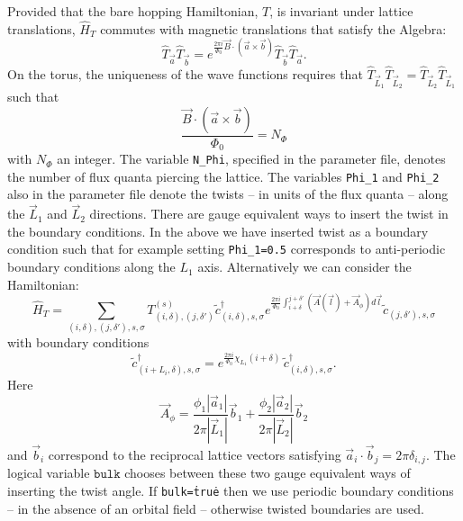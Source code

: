 Provided that the bare hopping Hamiltonian, $T$,  is invariant under lattice translations, $\hat{H}_T$ commutes with magnetic translations  that satisfy the  Algebra: 
\begin{equation}
\hat{T}_{\vec{a}} \hat{T}_{\vec{b}} =  e^{ \frac{2 \pi i}{\Phi_0}   \vec{B} \cdot \left( \vec{a} \times \vec{b} \right) }  \hat{T}_{\vec{b}} \hat{T}_{\vec{a}}. 
\end{equation}
On the  torus, the uniqueness of the wave functions requires that  $\hat{T}_{\vec{L}_1} \hat{T}_{\vec{L}_2}  =   \hat{T}_{\vec{L}_2} \hat{T}_{\vec{L}_1} $ such
that
\begin{equation}
\frac{\vec{B} \cdot \left( \vec{a} \times \vec{b}  \right) }{\Phi_0 } = N_{\Phi}   
\end{equation}
with  $N_\Phi $ an integer.  The variable \texttt{N\_Phi},   specified in the parameter file,   denotes the number of flux quanta piercing the lattice.    The variables \texttt{Phi\_1}  and   \texttt{Phi\_2} also   in the parameter file denote  the twists  -- in units of the flux quanta  --  along the $\vec{L}_1$ and  $\vec{L}_2$ directions.     There are gauge  equivalent ways to insert the  twist in the boundary conditions. In the above we  have inserted   twist as a boundary condition such  that for example setting  \texttt{Phi\_1=0.5}  corresponds to anti-periodic boundary conditions along the $L_1$  axis.   Alternatively we  can  consider the 
Hamiltonian:
\begin{equation}
\hat{H}_T = \sum_{(i,\delta), (j,\delta'), s, \sigma}    T_{(i,\delta), (j,\delta')}^{(s)}    \tilde{c}^{\dagger}_{(i,\delta),s,\sigma }   e^{\frac{2 \pi i}{\Phi_0} \int_{i + \delta}^{j + \delta'} \left(  \vec{A}(\vec{l})  + \vec{A}_{\phi} \right)  d \vec{l}} \tilde{c}^{}_{(j,\delta'),s,\sigma }
\end{equation}
with boundary conditions 
\begin{equation}
\tilde{c}^{\dagger}_{(i + L_i,\delta) ,s,\sigma }   =  e^{\frac{2 \pi i }{\Phi_0} \chi_{L_1} ( i + \delta ) } \, \tilde{c}^{\dagger}_{(i,\delta) ,s,\sigma }.
\end{equation}
Here 
\begin{equation}
\vec{A}_{\phi} =\frac{  \phi_1  |\vec{a}_1|} { 2 \pi |\vec{L}_1| } \vec{b}_1 +  \frac{  \phi_2  |\vec{a}_2|}{2 \pi  |\vec{L}_2| } \vec{b}_2
\end{equation}
and $\vec{b}_i$  correspond to the reciprocal lattice vectors satisfying  $ \vec{a}_i  \cdot  \vec{b}_j  = 2 \pi \delta_{i,j} $.   The logical variable $\texttt{bulk} $ chooses between these two  gauge equivalent ways  of inserting the twist angle. If \texttt{bulk=\.true\.}    then  we use periodic boundary conditions  --  in the absence of an orbital field -- otherwise  twisted boundaries are used.  
